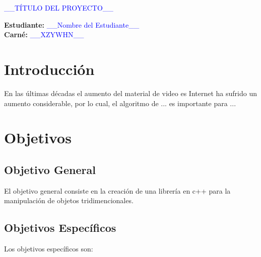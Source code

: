 \documentclass[letterpaper]{article}
\newcommand{\uic}{blue} %
\newcommand{\uim}{\_\_} %
\newcommand{\userinput}[1]{\textcolor{\uic}{\uim#1\uim}}
\begin{document}
\vspace*{2cm}

\begin{center}
\Huge
\userinput{TÍTULO DEL PROYECTO}
\vspace*{1cm}
\end{center}

\noindent
\small\baselineskip=14pt
\textbf{Estudiante:} \userinput{Nombre del Estudiante}\\
\textbf{Carné:} \userinput{XZYWHN}\\

\section{Introducción}

En las últimas décadas el aumento del material de video es Internet ha sufrido un aumento considerable, por lo cual, el algoritmo de ... es importante para ... 

\section{Objetivos}

\subsection{Objetivo General}

El objetivo general consiste en la creación de una librería en c++ para la manipulación de objetos tridimencionales.\\

\subsection{Objetivos Específicos}

Los objetivos específicos son:\\
\end{document}
